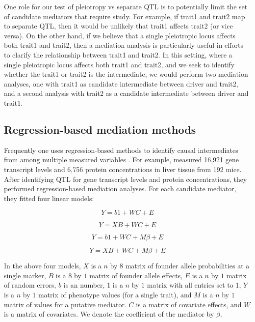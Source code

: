 \documentclass{article}
\begin{document}
One role for our test of pleiotropy vs separate QTL is to potentially limit the set of candidate mediators that require study. For example, if trait1 and trait2 map to separate QTL, then it would be unlikely that trait1 affects trait2 (or vice versa). On the other hand, if we believe that a single pleiotropic locus affects both trait1 and trait2, then a mediation analysis is particularly useful in efforts to clarify the relationship between trait1 and trait2. In this setting, where a single pleiotropic locus affects both trait1 and trait2, and we seek to identify whether the trait1 or trait2 is the intermediate, we would perform two mediation analyses, one with trait1 as candidate intermediate between driver and trait2, and a second analysis with trait2 as a candidate intermediate between driver and trait1. 

\subsection{Regression-based mediation methods}

Frequently one uses regression-based methods to identify causal intermediates from among multiple measured variables \citep{baron1986moderator}. For example, \citet{chick2016defining} measured 16,921 gene transcript levels and 6,756 protein concentrations in liver tissue from 192 mice. After identifying QTL for gene transcript levels and protein concentrations, they performed regression-based mediation analyses. For each candidate mediator, they fitted four linear models: 

\begin{equation}
Y = b1 + WC + E
\label{model1}
\end{equation}

\begin{equation}
Y = XB + WC + E
\label{model2}
\end{equation}

\begin{equation}
Y = b1 + WC + M\beta + E
\label{model3}
\end{equation}

\begin{equation}
Y = XB + WC + M\beta + E
\label{model4}
\end{equation}


In the above four models, $X$ is a $n$ by $8$ matrix of founder allele probabilities at a single marker, $B$ is a $8$ by $1$ matrix of founder allele effects, $E$ is a $n$ by $1$ matrix of random errors, $b$ is an number, $1$ is a $n$ by $1$ matrix with all entries set to $1$, $Y$ is a $n$ by $1$ matrix of phenotype values (for a single trait), and $M$ is a $n$ by $1$ matrix of values for a putative mediator. $C$ is a matrix of covariate effects, and $W$ is a matrix of covariates. We denote the coefficient of the mediator by $\beta$.
\end{document}
